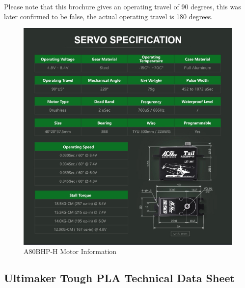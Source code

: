 Please note that this brochure gives an operating travel of 90 degrees, this was later confirmed to be false, the actual operating travel is 180 degrees.
\begin{figure}[H]
    \centering
    \includegraphics[width=\textwidth]{Images/A80_motor_info.png}
    \caption{A80BHP-H Motor Information}
    \label{fig:A80_motor_info}
\end{figure}

\subsection{Ultimaker Tough PLA Technical Data Sheet}
\label{appendix:tough_PLA}

